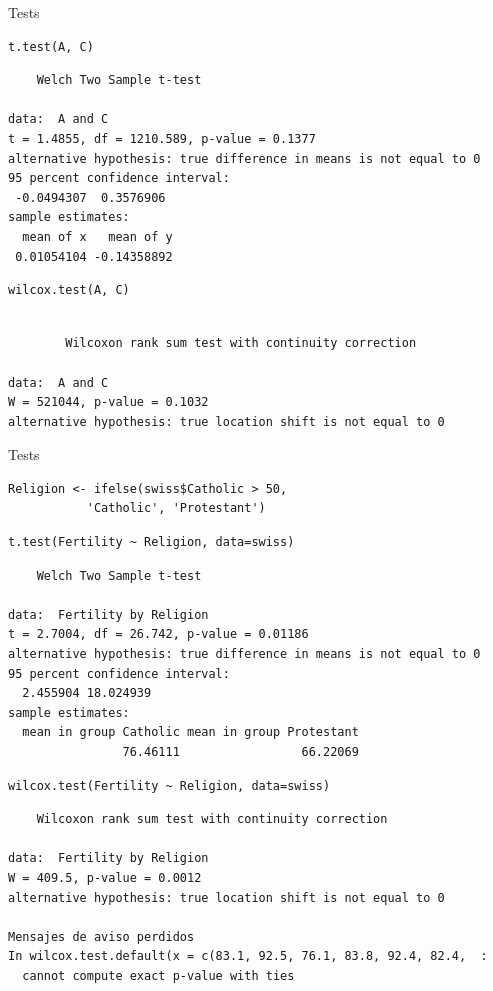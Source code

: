 \documentclass[xcolor={usenames,svgnames,dvipsnames}]{beamer}
\begin{document}
\begin{frame}[fragile,label=sec-2-7]{Tests}
 \lstset{language=R,numbers=none}
\begin{lstlisting}
t.test(A, C)
\end{lstlisting}

\begin{verbatim}
	Welch Two Sample t-test

data:  A and C
t = 1.4855, df = 1210.589, p-value = 0.1377
alternative hypothesis: true difference in means is not equal to 0
95 percent confidence interval:
 -0.0494307  0.3576906
sample estimates:
  mean of x   mean of y 
 0.01054104 -0.14358892
\end{verbatim}

\lstset{language=R,numbers=none}
\begin{lstlisting}
wilcox.test(A, C)
\end{lstlisting}

\begin{verbatim}

        Wilcoxon rank sum test with continuity correction

data:  A and C
W = 521044, p-value = 0.1032
alternative hypothesis: true location shift is not equal to 0
\end{verbatim}
\end{frame}
\begin{frame}[fragile,label=sec-2-8]{Tests}
 \lstset{language=R,numbers=none}
\begin{lstlisting}
Religion <- ifelse(swiss$Catholic > 50,
		   'Catholic', 'Protestant')
\end{lstlisting}

\lstset{language=R,numbers=none}
\begin{lstlisting}
t.test(Fertility ~ Religion, data=swiss)
\end{lstlisting}

\begin{verbatim}
	Welch Two Sample t-test

data:  Fertility by Religion
t = 2.7004, df = 26.742, p-value = 0.01186
alternative hypothesis: true difference in means is not equal to 0
95 percent confidence interval:
  2.455904 18.024939
sample estimates:
  mean in group Catholic mean in group Protestant 
                76.46111                 66.22069
\end{verbatim}

\lstset{language=R,numbers=none}
\begin{lstlisting}
wilcox.test(Fertility ~ Religion, data=swiss)
\end{lstlisting}

\begin{verbatim}
	Wilcoxon rank sum test with continuity correction

data:  Fertility by Religion
W = 409.5, p-value = 0.0012
alternative hypothesis: true location shift is not equal to 0

Mensajes de aviso perdidos
In wilcox.test.default(x = c(83.1, 92.5, 76.1, 83.8, 92.4, 82.4,  :
  cannot compute exact p-value with ties
\end{verbatim}
\end{frame}
\end{document}
